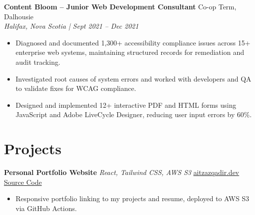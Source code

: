 \documentclass[11pt, letterpaper]{article}
\newenvironment{highlights}{
    \begin{itemize}[
        topsep=0.10 cm,
        parsep=0.10 cm,
        partopsep=0pt,
        itemsep=0pt,
        leftmargin=0.4 cm]}
        {\end{itemize}}
\begin{document}
    \textbf{Content Bloom – Junior Web Development Consultant} \hfill Co-op Term, Dalhousie
    \vspace{0.5mm}\\
    \textit{Halifax, Nova Scotia | Sept 2021 – Dec 2021}
    \begin{highlights}
        \item Diagnosed and documented 1,300+ accessibility compliance issues across 15+ enterprise web systems, maintaining structured records for remediation and audit tracking.
        \item Investigated root causes of system errors and worked with developers and QA to validate fixes for WCAG compliance.
        \item Designed and implemented 12+ interactive PDF and HTML forms using JavaScript and Adobe LiveCycle Designer, reducing user input errors by 60\%.
    \end{highlights}

    \section{Projects}

    \textbf{Personal Portfolio Website} \hfill \textit{React, Tailwind CSS, AWS S3}
    \textbar{} \href{https://aitzazqadir.dev}{aitzazqadir.dev}
    \textbar{} \href{https://github.com/aitzaz-qadir/portfolio-website}{Source Code}
    \begin{highlights}
        \item Responsive portfolio linking to my projects and resume, deployed to AWS S3 via GitHub Actions.
    \end{highlights}
\end{document}
